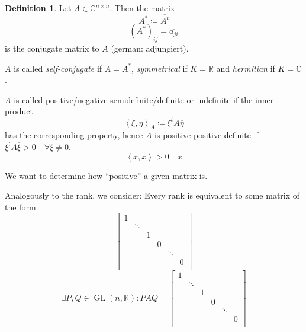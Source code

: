 \documentclass[a4paper,landscape,twocolumn]{article}
\newcommand\functional[1]{\left\langle{#1}\right\rangle}
\theoremstyle{definition}
\newtheorem{defi}{Definition}
\begin{document}
\begin{defi}
  \label{def-8.22}
  Let $A \in \mathbb C^{n\times n}$.
  Then the matrix
  \[ A^* \coloneqq \overline{A^t} \]
  \[ \left(A^*\right)_{ij} = \overline{a_{ji}} \]
  is the conjugate matrix to $A$ (german: adjungiert).

  $A$ is called \emph{self-conjugate} if $A = A^*$, \emph{symmetrical} if $K = \mathbb R$ and \emph{hermitian} if $K = \mathbb C$.

  $A$ is called positive/negative semidefinite/definite or indefinite if the inner product
  \[ \functional{\xi, \eta}_A \coloneqq \xi^t A \overline{\eta} \]
  has the corresponding property, hence $A$ is positive positive definite if $\xi^t A \overline{\xi} > 0 \quad \forall \xi \neq 0$.
  \[ \functional{x,x} > 0 \quad x \]
\end{defi}

We want to determine how \enquote{positive} a given matrix is.

Analogously to the rank, we consider:
Every rank is equivalent to some matrix of the form
\[
  \begin{bmatrix}
    1 &        &   &   &        &  \\
      & \ddots &   &   &        &  \\
      &        & 1 &   &        &  \\
      &        &   & 0 &        &  \\
      &        &   &   & \ddots &  \\
      &        &   &   &        & 0 \\
  \end{bmatrix}
\]
\[
  \exists P,Q \in \operatorname{GL}(n,\mathbb K): PAQ =
  \begin{bmatrix}
    1 &        &   &   &        &  \\
      & \ddots &   &   &        &  \\
      &        & 1 &   &        &  \\
      &        &   & 0 &        &  \\
      &        &   &   & \ddots &  \\
      &        &   &   &        & 0 \\
  \end{bmatrix}
\]
\end{document}
